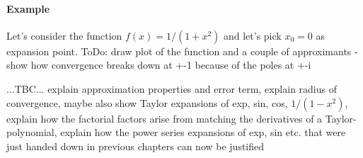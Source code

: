 
\paragraph{Example} Let's consider the function $f(x) = 1 / (1 + x^2)$ and let's pick $x_0 = 0$ as expansion point. ToDo: draw plot of the function and a couple of approximants - show how convergence breaks down at +-1 because of the poles at +-i



\medskip
...TBC... explain approximation properties and error term, explain radius of convergence, maybe also show Taylor expansions of exp, sin, cos, $1 / (1 - x^2)$, explain how the factorial factors arise from matching the derivatives of a Taylor-polynomial, explain how the power series expansions of exp, sin etc. that were just handed down in previous chapters can now be justified




